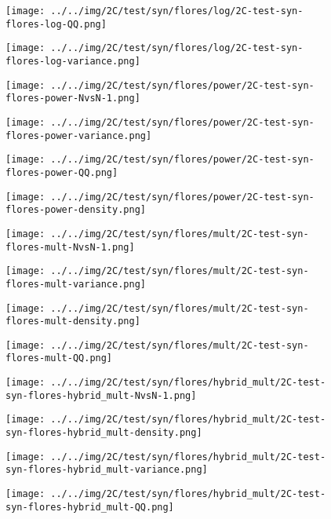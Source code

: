 \begin{figure}[H]
\centering	\texttt{[image: ../../img/2C/test/syn/flores/log/2C-test-syn-flores-log-QQ.png]}
\end{figure}
\begin{figure}[H]
\centering	\texttt{[image: ../../img/2C/test/syn/flores/log/2C-test-syn-flores-log-variance.png]}
\end{figure}
\begin{figure}[H]
\centering	\texttt{[image: ../../img/2C/test/syn/flores/power/2C-test-syn-flores-power-NvsN-1.png]}
\end{figure}
\begin{figure}[H]
\centering	\texttt{[image: ../../img/2C/test/syn/flores/power/2C-test-syn-flores-power-variance.png]}
\end{figure}
\begin{figure}[H]
\centering	\texttt{[image: ../../img/2C/test/syn/flores/power/2C-test-syn-flores-power-QQ.png]}
\end{figure}
\begin{figure}[H]
\centering	\texttt{[image: ../../img/2C/test/syn/flores/power/2C-test-syn-flores-power-density.png]}
\end{figure}
\begin{figure}[H]
\centering	\texttt{[image: ../../img/2C/test/syn/flores/mult/2C-test-syn-flores-mult-NvsN-1.png]}
\end{figure}
\begin{figure}[H]
\centering	\texttt{[image: ../../img/2C/test/syn/flores/mult/2C-test-syn-flores-mult-variance.png]}
\end{figure}
\begin{figure}[H]
\centering	\texttt{[image: ../../img/2C/test/syn/flores/mult/2C-test-syn-flores-mult-density.png]}
\end{figure}
\begin{figure}[H]
\centering	\texttt{[image: ../../img/2C/test/syn/flores/mult/2C-test-syn-flores-mult-QQ.png]}
\end{figure}
\begin{figure}[H]
\centering	\texttt{[image: ../../img/2C/test/syn/flores/hybrid\_mult/2C-test-syn-flores-hybrid\_mult-NvsN-1.png]}
\end{figure}
\begin{figure}[H]
\centering	\texttt{[image: ../../img/2C/test/syn/flores/hybrid\_mult/2C-test-syn-flores-hybrid\_mult-density.png]}
\end{figure}
\begin{figure}[H]
\centering	\texttt{[image: ../../img/2C/test/syn/flores/hybrid\_mult/2C-test-syn-flores-hybrid\_mult-variance.png]}
\end{figure}
\begin{figure}[H]
\centering	\texttt{[image: ../../img/2C/test/syn/flores/hybrid\_mult/2C-test-syn-flores-hybrid\_mult-QQ.png]}
\end{figure}
